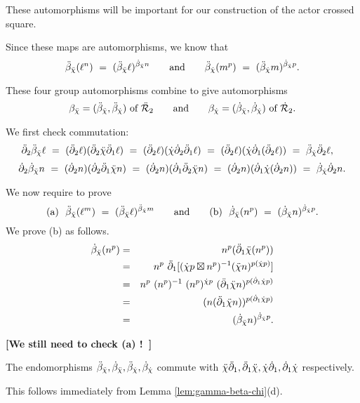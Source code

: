 \medskip\noindent
These automorphisms will be important for our construction 
of the actor crossed square.

Since these maps are automorphisms, we know that
$$
\ddot{\beta}_{\ddot{\chi}} (\ell^n) ~=~ (\ddot{\beta}_{\ddot{\chi}} \ell)^{\dot{\beta}_{\ddot{\chi}} n}
\qquad\mbox{and}\qquad
    \ddot{\beta}_{\dot{\chi}} (m^p) ~=~ (\ddot{\beta}_{\dot{\chi}} m)^{\dot{\beta}_{\dot{\chi}} p}.
$$

\begin{lem}
These four group automorphisms combine to give automorphisms 
$$
\beta_{\ddot{\chi}} = (\ddot{\beta}_{\ddot{\chi}}, \ddot{\beta}_{\dot{\chi}}) ~\mbox{of}~ \ddot{\mathcal{R}}_2
\qquad\mbox{and}\qquad
 \beta_{\dot{\chi}} = (\dot{\beta}_{\ddot{\chi}}, \dot{\beta}_{\dot{\chi}}) ~\mbox{of}~ \dot{\mathcal{R}}_2.
$$
\end{lem}
\begin{pf}
We first check commutation:
$$
\ddot{\partial}_2 \ddot{\beta}_{\ddot{\chi}} \ell 
  ~=~ (\ddot{\partial}_2 \ell)(\ddot{\partial}_2 \ddot{\chi} \ddot{\partial}_1 \ell) 
  ~=~ (\ddot{\partial}_2 \ell)(\dot{\chi} \dot{\partial}_2 \ddot{\partial}_1 \ell) 
  ~=~ (\ddot{\partial}_2 \ell) (\dot{\chi} \dot{\partial}_1(\ddot{\partial}_2 \ell)) 
  ~=~ \ddot{\beta}_{\dot{\chi}} \ddot{\partial}_2 \ell,\quad
$$
$$
\dot{\partial}_2 \dot{\beta}_{\ddot{\chi}} n 
  ~=~ (\dot{\partial}_2 n)(\dot{\partial}_2 \ddot{\partial}_1 \ddot{\chi} n) 
  ~=~ (\dot{\partial}_2 n) (\dot{\partial}_1 \ddot{\partial}_2 \ddot{\chi} n) 
  ~=~ (\dot{\partial}_2 n)(\dot{\partial}_1 \dot{\chi} (\dot{\partial}_2 n))  
  ~=~ \dot{\beta}_{\dot{\chi}} \dot{\partial}_2 n.
$$

We now require to prove
$$
\mbox{(a)}~~
\ddot{\beta}_{\ddot{\chi}}(\ell^m) ~=~ (\ddot{\beta}_{\ddot{\chi}} \ell)^{\ddot{\beta}_{\dot{\chi}} m}
\qquad\mbox{and}\qquad 
\mbox{(b)}~~
    \dot{\beta}_{\ddot{\chi}}(n^p) ~=~ (\dot{\beta}_{\ddot{\chi}} n)^{\dot{\beta}_{\dot{\chi}} p}.
$$
We prove (b) as follows.
\begin{eqnarray*}
\dot{\beta}_{\ddot{\chi}}(n^p)
 &=&  n^p (\ddot{\partial}_1 \ddot{\chi} (n^p)) \\
 &=&  n^p~\ddot{\partial}_1[(\dot{\chi} p \boxtimes n^p)^{-1} (\ddot{\chi} n)^{p(\dot{\chi} p)}] \\
 &=&  n^p~(n^p)^{-1}~(n^p)^{\dot{\chi} p}~(\ddot{\partial}_1 \ddot{\chi} n)^{p(\dot{\partial}_1 \dot{\chi} p)} \\
 &=&  (n(\ddot{\partial}_1 \ddot{\chi} n))^{p(\dot{\partial}_1 \dot{\chi} p)} \\
 &=&  (\dot{\beta}_{\ddot{\chi}} n)^{\dot{\beta}_{\dot{\chi}} p}.
\end{eqnarray*}

\medskip\noindent
{\bf [We still need to check (a) !~]}
\end{pf}

\bigskip
\begin{lem}
The endomorphisms $\ddot{\beta}_{\ddot{\chi}}, \dot{\beta}_{\ddot{\chi}}, \ddot{\beta}_{\dot{\chi}}, \dot{\beta}_{\dot{\chi}}$ 
commute with 
$\ddot{\chi} \ddot{\partial}_1, \ddot{\partial}_1 \ddot{\chi}, \dot{\chi} \dot{\partial}_1, \dot{\partial}_1 \dot{\chi}$ respectively.
\end{lem}
\begin{pf}
This follows immediately from Lemma \ref{lem:gamma-beta-chi}(d).
\end{pf}

